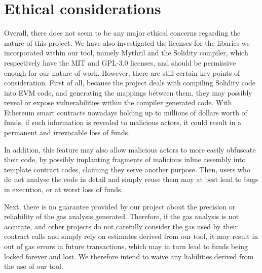\chapter{Ethical considerations}
\label{chap:ethics}

Overall, there does not seem to be any major ethical concerns regarding the nature of 
this project. We have also investigated the licenses for the libaries we incorporated
within our tool, namely Mythril and the Solidity compiler, which respectively have the MIT and GPL-3.0
licenses, and should be permissive enough for our nature of work. 
However, there are still certain key points of consideration. First of all,
because the project deals with compiling Solidity code into 
EVM code, and generating the mappings between them, they may possibly reveal or
expose vulnerabilities within the compiler generated code. With Ethereum smart contracts 
nowadays holding up to millions of dollars worth of funds, if such information is revealed
to malicious actors, it could result in a permanent and irrevocable loss of funds.

In addition, this feature may also allow malicious actors to more easily obfuscate their code,
by possibly implanting fragments of malicious inline assembly into template contract codes,
claiming they serve another purpose. Then, users who do not analyse the code in detail and
simply reuse them may at best lead to bugs in execution, or at worst loss of funds.

Next, there is no guarantee provided by our project about the precision or reliability
of the gas analysis generated. Therefore, if the gas analysis is not accurate, and other projects
do not carefully consider the gas used by their contract calls and simply rely on estimates derived
from our tool, it may result in out of gas errors in future transactions, which may in turn
lead to funds being locked forever and lost. We therefore intend to waive any liabilities derived
from the use of our tool.
